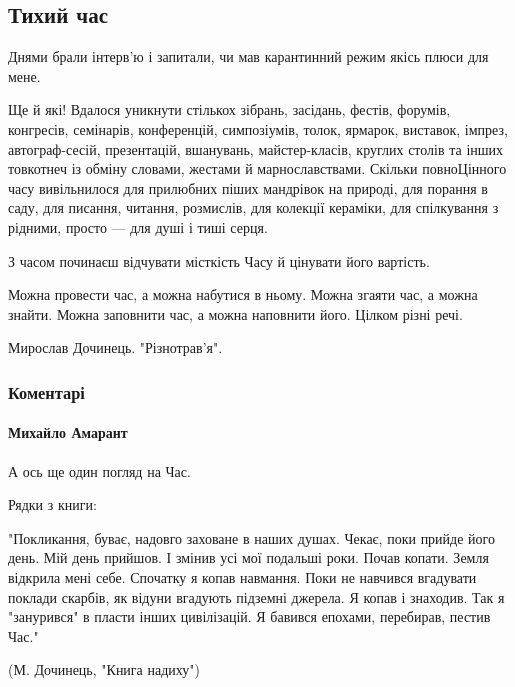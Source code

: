  
 
 

\subsection{Тихий час}
\label{sec:01_11_2020.fb.mido_mukachevo.1.chas}

Днями брали інтерв’ю і запитали, чи мав карантинний режим якісь плюси для мене.

Ще й які! Вдалося уникнути стількох зібрань, засідань, фестів, форумів,
конгресів, семінарів, конференцій, симпозіумів, толок, ярмарок, виставок,
імпрез, автограф-сесій, презентацій, вшанувань, майстер-класів, круглих столів
та інших товкотнеч із обміну словами, жестами й марнославствами. Скільки
повноЦінного часу вивільнилося для прилюбних піших мандрівок на природі, для
порання в саду, для писання, читання, розмислів, для колекції кераміки, для
спілкування з рідними, просто --- для душі і тиші серця.

З часом починаєш відчувати місткість Часу й цінувати його вартість.

Можна провести час, а можна набутися в ньому. Можна згаяти час, а можна
знайти. Можна заповнити час, а можна наповнити його. Цілком різні речі.

Мирослав Дочинець. "Різнотрав'я".

\subsubsection{Коментарі}

\paragraph{Михайло Амарант}

А ось ще один погляд на Час.

Рядки з книги:

"Покликання, буває, надовго заховане в наших душах.  Чекає, поки прийде його
день. Мій день прийшов. І змінив усі мої подальші роки. Почав копати.  Земля
відкрила мені себе.  Спочатку я копав навмання. Поки не навчився вгадувати
поклади скарбів, як відуни вгадують підземні джерела.  Я копав і знаходив. Так
я "занурився" в пласти інших цивілізацій.  Я бавився епохами, перебирав, пестив
Час."

(М. Дочинець, "Книга надиху")
